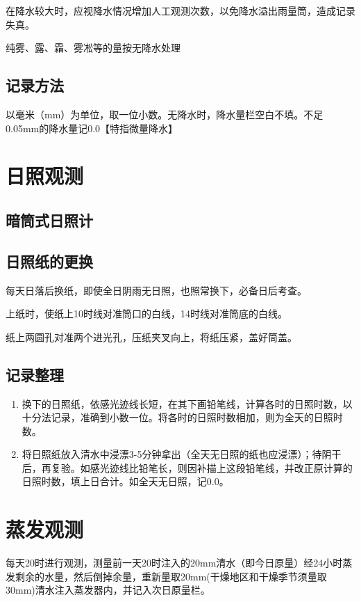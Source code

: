 ﻿\documentclass[UTF8,11pt]{ctexbook}%
\begin{document}
在降水较大时，应视降水情况增加人工观测次数，以免降水溢出雨量筒，造成记录失真。

纯雾、露、霜、雾凇等的量按无降水处理

\subsection{记录方法}

以毫米（mm）为单位，取一位小数。无降水时，降水量栏空白不填。不足0.05mm的降水量记0.0【特指微量降水】

\section{日照观测}

\subsection{暗筒式日照计}

\subsection{日照纸的更换}

每天日落后换纸，即使全日阴雨无日照，也照常换下，必备日后考查。

上纸时，使纸上10时线对准筒口的白线，14时线对准筒底的白线。

纸上两圆孔对准两个进光孔，压纸夹叉向上，将纸压紧，盖好筒盖。

\subsection{记录整理}

\begin{enumerate}
	\item 换下的日照纸，依感光迹线长短，在其下画铅笔线，计算各时的日照时数，以十分法记录，准确到小数一位。将各时的日照时数相加，则为全天的日照时数。
	\item 将日照纸放入清水中浸漂3-5分钟拿出（全天无日照的纸也应浸漂）；待阴干后，再复验。如感光迹线比铅笔长，则因补描上这段铅笔线，并改正原计算的日照时数，填上日合计。如全天无日照，记0.0。
\end{enumerate}

\section{蒸发观测}

每天20时进行观测，测量前一天20时注入的20mm清水（即今日原量）经24小时蒸发剩余的水量，然后倒掉余量，重新量取20mm(干燥地区和干燥季节须量取30mm)清水注入蒸发器内，并记入次日原量栏。
\end{document}
